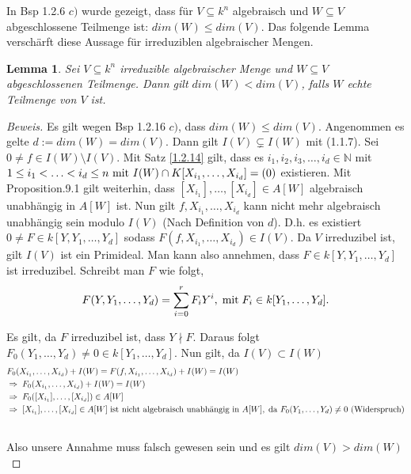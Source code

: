 \documentclass{article}
\newtheorem{lemma}[satz]{Lemma}
\newcommand*{\indx}[2]{{#1}_{#2}}
\newcommand*{\potx}[2]{{#1}^{#2}}
\newcommand*{\dkette}[2]{${#1}_1,{#1}_2,{#1}_3,\ldots,{#1}_{#2} \in \mathbb{N}$}
\begin{document}
In Bsp 1.2.6 $c)$ wurde gezeigt, dass für $V\subseteq k^n$ algebraisch und $W\subseteq V$ abgeschlossene Teilmenge ist: $dim(W)\leq dim(V)$. Das folgende Lemma verschärft diese Aussage für irreduziblen algebraischer Mengen.

\begin{lemma}
	Sei $V\subseteq k^n$ irreduzible algebraischer Menge und $W\subseteq V$ abgeschlossenen Teilmenge. Dann gilt $dim(W)<dim(V)$, falls $W$ echte Teilmenge von $V$ ist.
\end{lemma} 

\begin{proof}[Beweis]
	Es gilt wegen Bsp 1.2.16 $c)$, dass $dim(W)\leq dim(V)$. Angenommen es gelte $d:=dim(W)=dim(V)$. Dann gilt $I(V)\subsetneq I(W)$ mit (1.1.7). Sei $0\neq f\in I(W)\setminus I(V)$. Mit Satz \ref{1.2.14} gilt, dass es \dkette{i}{d} mit $ 1\leq\indx{i}{1}<\ldots<\indx{i}{d}\leq n \textnormal{ mit } I(W)\cap K[\indx{X}{\indx{i}{1}},\ldots,\indx{X}{\indx{i}{d}}]=(0)$ existieren. Mit Proposition.9.1 gilt weiterhin, dass $[\indx{X}{\indx{i}{1}}],\ldots,[\indx{X}{\indx{i}{d}}] \in A[W]$ algebraisch unabhängig in $A[W]$ ist. Nun gilt $f,\indx{X}{\indx{i}{1}},\ldots,\indx{X}{\indx{i}{d}}$ kann nicht mehr algebraisch unabhängig sein  modulo $I(V)$ (Nach Definition von $d$).
	D.h. es existiert $0\neq F\in k[Y,\indx{Y}{1},\ldots,\indx{Y}{d}]$ sodass $F(f,\indx{X}{\indx{i}{1}},\ldots,\indx{X}{\indx{i}{d}})\in I(V)$. Da $V$ irreduzibel ist, gilt $I(V)$ ist ein Primideal. Man kann also annehmen, dass $F\in k[Y,\indx{Y}{1},\ldots,\indx{Y}{d}]$ ist irreduzibel.
	Schreibt man $F$ wie folgt, 
	\begin{displaymath}
	F(Y,\indx{Y}{1},\ldots,\indx{Y}{d})=\sum_{i=0}^{r}\indx{F}{i}\potx{Y}{i},\; \textnormal{mit}\;  \indx{F}{i}\in k[\indx{Y}{1},\ldots,\indx{Y}{d}].
	\end{displaymath}
	
	Es gilt, da $F$ irreduzibel ist, dass $Y\nmid F$. Daraus folgt $\indx{F}{0}(\indx{Y}{1},\ldots,\indx{Y}{d})\neq0 \in k[\indx{Y}{1},\ldots,\indx{Y}{d}]$. Nun gilt, da $I(V)\subset I(W)$ 
	\begin{align*}
	&\indx{F}{0}(\indx{X}{\indx{i}{1}},\ldots,\indx{X}{\indx{i}{d}})+I(W)=F(f,\indx{X}{\indx{i}{1}},\ldots,\indx{X}{\indx{i}{d}})+I(W)=I(W)\\&
	\Rightarrow \; \indx{F}{0}(\indx{X}{\indx{i}{1}},\ldots,\indx{X}{\indx{i}{d}})+I(W)=I(W)\\&
	\Rightarrow \; \indx{F}{0}([\indx{X}{\indx{i}{1}}],\ldots,[\indx{X}{\indx{i}{d}}]) \in A[W]\\&
	\Rightarrow\; [\indx{X}{\indx{i}{1}}],\ldots,[\indx{X}{\indx{i}{d}}]\in A[W]\; \textnormal{ist nicht algebraisch unabhängig in }A[W],\;\textnormal{da $\indx{F}{0}(\indx{Y}{1},\ldots,\indx{Y}{d})\neq0$ (Widerspruch)}\\& 
	\end{align*}
	
	Also unsere Annahme muss falsch gewesen sein und es gilt $dim(V)>dim(W)$
\end{proof}
\end{document}

